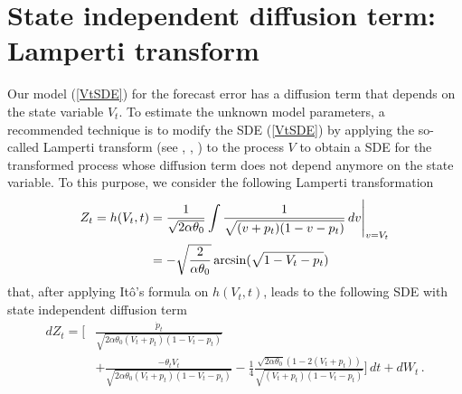 \documentclass[11pt]{article}
\theoremstyle{definition}
\begin{document}


\section{State independent diffusion term: Lamperti transform} \label{Section_3}

Our model (\ref{VtSDE}) for the forecast error has a diffusion term that depends on the state variable $V_t$. To estimate the unknown model parameters, a recommended technique is to modify the SDE (\ref{VtSDE}) by applying the so-called Lamperti transform (see \cite[40--41]{iacus1}, \cite{moma}, \cite[98--100]{saso}) to the process $V$ to obtain a SDE for the transformed process whose diffusion term does not depend anymore on the state variable. To this purpose, we consider the following Lamperti transformation  
\begin{align}
Z_t = h(V_t, t)  & = \frac{1}{\sqrt{2 \alpha \theta_0 }} \int \frac{1}{\sqrt{(v + p_t)(1 - v - p_t)}} \,dv \Bigg{\vert}_{v = V_t}  \nonumber \\
& = - \sqrt{ \frac{2}{ \alpha \theta_0 }} \arcsin (\sqrt{ 1 - V_t - p_t})
\end{align}
that, after applying It\^{o}'s formula on $h(V_t, t)$, leads to the following SDE with state independent diffusion term
\begin{align}
dZ_t = \Bigg[  & \frac{\dot{p}_t}{ \sqrt{2 \alpha \theta_0 (V_t + p_t)(1 - V_t - p_t)}}  \nonumber \\ 
& + \frac{- \theta_t V_t}{ \sqrt{2  \alpha \theta_0 (V_t + p_t)(1 - V_t - p_t)}} - \frac{1}{4} \frac{\sqrt{2 \alpha \theta_0} \left( 1 - 2 (V_t + p_t)\right)}{\sqrt{(V_t + p_t)(1 - V_t - p_t)}}  \Bigg] \,dt + dW_t \,. \label{eq:stindepSDE}
\end{align}
\end{document}
